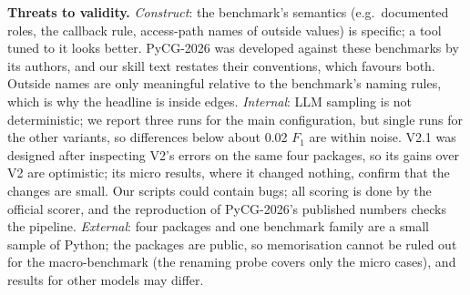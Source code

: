\textbf{Threats to validity.}
\label{sec:threats}
\emph{Construct}: the benchmark's semantics (e.g.\ documented roles, the callback
rule, access-path names of outside values) is specific; a tool tuned to it
looks better. PyCG-2026 was developed against these benchmarks by its authors,
and our skill text restates their conventions, which favours both. Outside names
are only meaningful relative to the benchmark's naming rules, which is why the
headline is inside edges. \emph{Internal}: LLM sampling is not deterministic; we
report three runs for the main configuration, but single runs for the other
variants, so differences below about 0.02 $F_1$ are within noise. V2.1 was
designed after inspecting V2's errors on the same four packages, so its gains
over V2 are optimistic; its micro results, where it changed nothing, confirm
that the changes are small. Our scripts could contain bugs; all scoring is done by
the official scorer, and the reproduction of PyCG-2026's published numbers checks
the pipeline. \emph{External}: four packages and one benchmark family are a
small sample of Python; the packages are public, so memorisation cannot be ruled
out for the macro-benchmark (the renaming probe covers only the micro cases), and
results for other models may differ.
